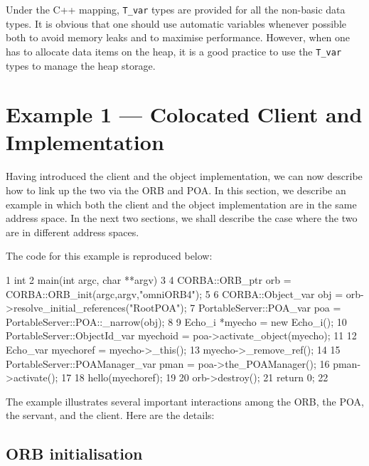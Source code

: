 \documentclass[11pt,twoside,a4paper]{book}
\newcommand{\type}[1]{\texttt{#1}}
\begin{document}
Under the C++ mapping, \type{T\_var} types are provided for all the
non-basic data types.  It is obvious that one should use automatic
variables whenever possible both to avoid memory leaks and to maximise
performance. However, when one has to allocate data items on the heap,
it is a good practice to use the \type{T\_var} types to manage the
heap storage.

\section{Example 1 --- Colocated Client and Implementation}
\label{objeg1}

Having introduced the client and the object implementation, we can now
describe how to link up the two via the ORB and POA. In this section,
we describe an example in which both the client and the object
implementation are in the same address space. In the next two
sections, we shall describe the case where the two are in different
address spaces.

The code for this example is reproduced below:


\lstset{labelstep=1,gobble=4}
\begin{cxxlisting}
 1  int
 2  main(int argc, char **argv)
 3  {
 4    CORBA::ORB_ptr orb = CORBA::ORB_init(argc,argv,"omniORB4");
 5
 6    CORBA::Object_var       obj = orb->resolve_initial_references("RootPOA");
 7    PortableServer::POA_var poa = PortableServer::POA::_narrow(obj);
 8
 9    Echo_i *myecho = new Echo_i();
10    PortableServer::ObjectId_var myechoid = poa->activate_object(myecho);
11
12    Echo_var myechoref = myecho->_this();
13    myecho->_remove_ref();
14
15    PortableServer::POAManager_var pman = poa->the_POAManager();
16    pman->activate();
17
18    hello(myechoref);
19
20    orb->destroy();
21    return 0;
22  }
\end{cxxlisting}
\lstset{labelstep=0,gobble=0}

The example illustrates several important interactions among the ORB,
the POA, the servant, and the client. Here are the details:

\subsection{ORB initialisation}
\end{document}
